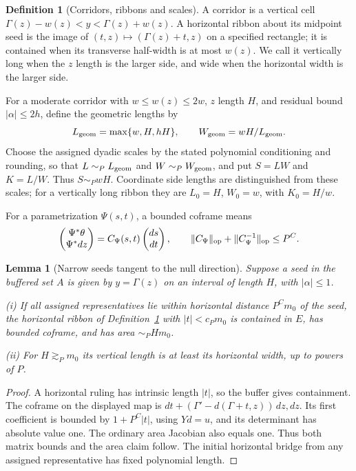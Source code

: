 \documentclass[11pt]{amsart}
\newtheorem{lemma}[theorem]{Lemma}
\theoremstyle{definition}
\newtheorem{definition}{Definition}[section]
\theoremstyle{remark}
\numberwithin{equation}{section}
\begin{document}
\begin{definition}[Corridors, ribbons and scales]\label{def:ribbons}
A corridor is a vertical cell $\Gamma(z)-w(z)<y<\Gamma(z)+w(z)$. A horizontal ribbon about its midpoint seed is the image of $(t,z)\mapsto(\Gamma(z)+t,z)$ on a specified rectangle; it is contained when its transverse half-width is at most $w(z)$. We call it vertically long when the $z$ length is the larger side, and wide when the horizontal width is the larger side.

For a moderate corridor with $w\le w(z)\le2w$, $z$ length $H$, and residual bound $|\alpha|\le2h$, define the geometric lengths by
\begin{equation}\label{geo:assigned-scales}
L_{\rm geom}=\max\{w,H,hH\},\qquad W_{\rm geom}=wH/L_{\rm geom}.
\end{equation}
Choose the assigned dyadic scales by the stated polynomial conditioning and rounding, so that $L\sim_P L_{\rm geom}$ and $W\sim_P W_{\rm geom}$, and put $S=LW$ and $K=L/W$. Thus $S\sim_P wH$. Coordinate side lengths are distinguished from these scales; for a vertically long ribbon they are $L_0=H$, $W_0=w$, with $K_0=H/w$.

For a parametrization $\Psi(s,t)$, a bounded coframe means
\[
\begin{pmatrix}\Psi^*\theta\\\Psi^*dz\end{pmatrix}=C_\Psi(s,t)\begin{pmatrix}ds\\dt\end{pmatrix},\qquad \|C_\Psi\|_{\rm op}+\|C_\Psi^{-1}\|_{\rm op}\le P^C.
\]
\end{definition}
\begin{lemma}[Narrow seeds tangent to the null direction]\label{geo:narrow-null}
Suppose a seed in the buffered set $A$ is given by $y=\Gamma(z)$ on an interval of length $H$, with $|\alpha|\le1$.

\noindent\textup{(i)} If all assigned representatives lie within horizontal distance $P^Cm_0$ of the seed, the horizontal ribbon of Definition~\ref{def:ribbons} with $|t|<c_Pm_0$ is contained in $E$, has bounded coframe, and has area $\sim_P Hm_0$.

\noindent\textup{(ii)} For $H\gtrsim_Pm_0$ its vertical length is at least its horizontal width, up to powers of $P$.
\end{lemma}
\begin{proof}
A horizontal ruling has intrinsic length $|t|$, so the buffer gives containment. The coframe on the displayed map is $dt+(\Gamma'-d(\Gamma+t,z))\,dz,dz$. Its first coefficient is bounded by $1+P^C|t|$, using $Yd=u$, and its determinant has absolute value one. The ordinary area Jacobian also equals one. Thus both matrix bounds and the area claim follow. The initial horizontal bridge from any assigned representative has fixed polynomial length. 
\end{proof}
\end{document}
